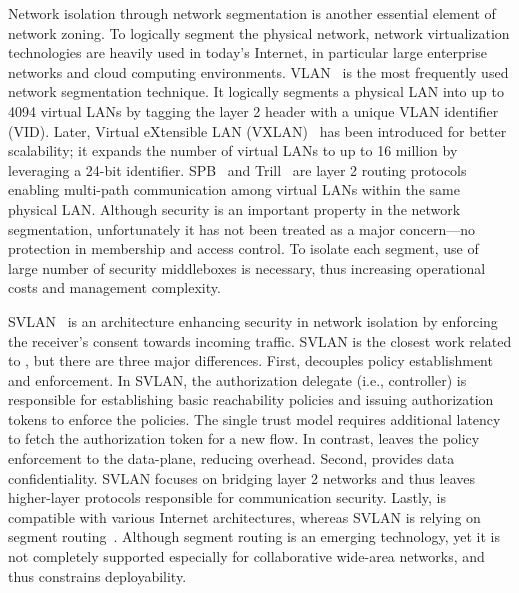Network isolation through network segmentation is another essential element of network zoning. 
To logically segment the physical network, network virtualization technologies are heavily used in today's Internet, in particular large enterprise networks and cloud computing environments.
VLAN~\cite{ieee2018vlan} is the most frequently used network segmentation technique.
It logically segments a physical LAN into up to 4094 virtual LANs by tagging the layer 2 header with a unique VLAN identifier (VID).
Later, Virtual eXtensible LAN (VXLAN)~\cite{rfc7348} has been introduced for better scalability; it expands the number of virtual LANs to up to 16 million by leveraging a 24-bit identifier.
SPB~\cite{ieee2012spb} and Trill~\cite{rfc6325,rfc7176} are layer 2 routing protocols enabling multi-path communication among virtual LANs within the same physical LAN. 
Although security is an important property in the network segmentation, unfortunately it has not been treated as a major concern---no protection in membership and access control.
To isolate each segment, use of large number of security middleboxes is necessary, thus increasing operational costs and management complexity. 

SVLAN~\cite{kwon2020svlan} is an architecture enhancing security in network isolation by enforcing the receiver's consent towards incoming traffic. 
SVLAN is the closest work related to \name, but there are three major differences.
First, \name decouples policy establishment and enforcement. In SVLAN, the authorization delegate (i.e., controller) is responsible for establishing basic reachability policies and issuing authorization tokens to enforce the policies.
The single trust model requires additional latency to fetch the authorization token for a new flow.
In contrast, \name leaves the policy enforcement to the data-plane, reducing overhead.
Second, \name provides data confidentiality.
SVLAN focuses on bridging layer 2 networks and thus leaves higher-layer protocols responsible for communication security. 
Lastly, \name is compatible with various Internet architectures, whereas SVLAN is relying on segment routing~\cite{rfc8402,rfc8660}. 
Although segment routing is an emerging technology, yet it is not completely supported especially for collaborative wide-area networks, and thus constrains deployability.

